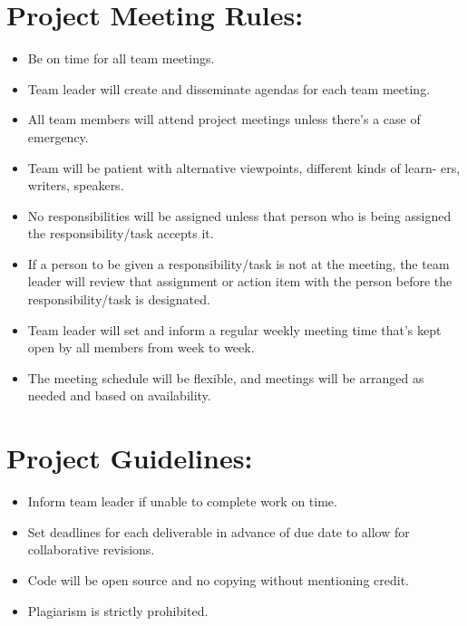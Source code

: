 \documentclass[12pt]{article}
\begin{document}
\newpage

\vspace{5cm}

\tableofcontents

\newpage
\section{Project Meeting Rules:}
\vspace{0.5cm}
\begin{itemize}
    \item Be on time for all team meetings. \\
    \item Team leader will create and disseminate agendas for each team meeting. \\
    \item All team members will attend project meetings unless there’s a case of
emergency. \\
    \item Team will be patient with alternative viewpoints, different kinds of learn-
ers, writers, speakers. \\
    \item No responsibilities will be assigned unless that person who is being assigned the responsibility/task accepts it. \\
    \item If a person to be given a responsibility/task is not at the meeting, the
team leader will review that assignment or action item with the person
before the responsibility/task is designated. \\
    \item Team leader will set and inform a regular weekly meeting time that’s kept
open by all members from week to week. \\
    \item The meeting schedule will be flexible, and meetings will be arranged as
needed and based on availability.
\end{itemize}

\newpage
\section{Project Guidelines:}
\vspace{0.7cm}
\begin{itemize}
    \item Inform team leader if unable to complete work on time.
    \item Set deadlines for each deliverable in advance of due date to allow for
collaborative revisions.
    \item Code will be open source and no copying without mentioning credit.
    \item Plagiarism is strictly prohibited. \\
\end{itemize}
\end{document}
